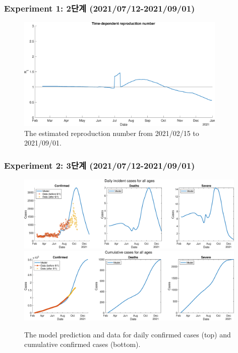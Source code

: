 \documentclass[aspectratio=169, 9pt, xcolor=dvipsnames]{beamer}
\begin{document}
	\begin{frame}\frametitle{Experiment 1: 2단계 (2021/07/12-2021/09/01)}
	    \begin{figure}
	    	\centering
	    	\includegraphics[width=10cm]{../results/predict_exp_1_sd3_same_school_same/rep_num.eps}
	    	\caption{The estimated reproduction number from 2021/02/15 to 2021/09/01.}
	    \end{figure}
	\end{frame}

	\begin{frame}\frametitle{Experiment 2: 3단계 (2021/07/12-2021/09/01)}
	    \begin{figure}
	    	\centering
	    	\includegraphics[width=11cm]{../results/predict_exp_2_sd3_same_school_same/daily_all_age.eps}
	    	\includegraphics[width=11cm]{../results/predict_exp_2_sd3_same_school_same/cumul_all_age.eps}
	    	\caption{The model prediction and data for daily confirmed cases (top) and cumulative confirmed cases (bottom).}
	    \end{figure}
	\end{frame}
\end{document}
